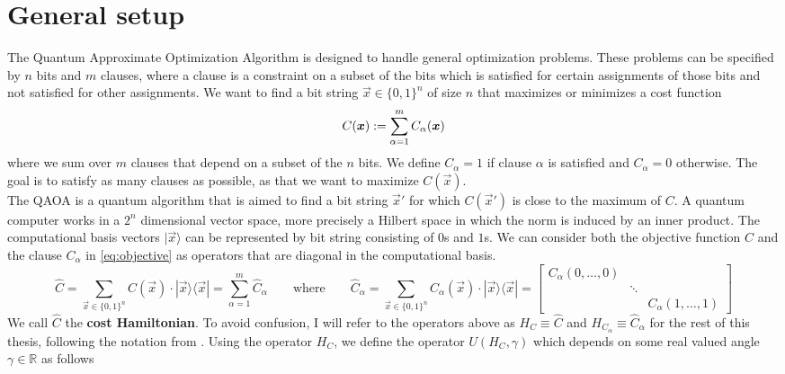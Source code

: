 \section{General setup}
\label{sec:general-setup}
The Quantum Approximate Optimization Algorithm is designed to handle general optimization problems. These problems can be specified by $n$ bits and $m$ clauses, where a clause is a constraint on a subset of the bits which is satisfied for certain assignments of those bits and not satisfied for other assignments. We want to find a bit string $\vec{x} \in \{0,1\}^n$ of size $n$ that maximizes or minimizes a cost function \cite{FGG14}
\begin{equation}
	C(\bm{x}) := \sum_{\alpha=1}^m C_\alpha(\bm{x})
	\label{eq:objective}
\end{equation}
where we sum over $m$ clauses that depend on a subset of the $n$ bits. We define $C_\alpha = 1$ if clause $\alpha$ is satisfied and $C_\alpha=0$ otherwise. The goal is to satisfy as many clauses as possible, as that we want to maximize $C(\vec{x})$.
\\
The QAOA is a quantum algorithm that is aimed to find a bit string $\vec{x}'$ for which $C(\vec{x}')$ is close to the maximum of $C$. A quantum computer works in a $2^n$ dimensional vector space, more precisely a Hilbert space in which the norm is induced by an inner product. The computational basis vectors $|\vec{x}\rangle$ can be represented by bit string consisting of $0$s and $1$s. We can consider both the objective function $C$ and the clause $C_\alpha$ in \eqref{eq:objective} as operators that are diagonal in the computational basis.
\begin{equation}
	\hat{C} = \sum_{\vec{x}\in\{0,1\}^n} C(\vec{x})\cdot |\vec{x}\rangle\langle \vec{x} | =  \sum_{\alpha=1}^m \hat{C}_\alpha
	\qquad \text{where} \qquad 
	\hat{C}_\alpha = \sum_{\vec{x}\in\{0,1\}^n} C_\alpha(\vec{x})\cdot |\vec{x}\rangle\langle \vec{x} | = \begin{bmatrix}
	C_\alpha(0, \dots, 0) &  & \\
	& \ddots & \\
	& & C_\alpha(1,\dots, 1)
	\end{bmatrix}
	\label{eq:costHamiltonian}
\end{equation}
We call $\hat{C}$ the \textbf{cost Hamiltonian}. To avoid confusion, I will refer to the operators above as $H_C \equiv \hat{C}$ and $H_{C_\alpha} \equiv \hat{C}_\alpha$ for the rest of this thesis, following the notation from \cite{Hidary}. Using the operator $H_C$, we define the operator $U(H_C, \gamma)$ which depends on some real valued angle $\gamma \in \mathbb{R}$ as follows

